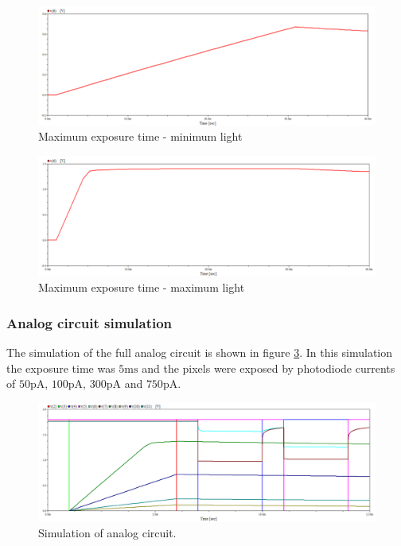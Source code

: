 \begin{figure}
    \centering
    \includegraphics[width=\textwidth]{graphs/maxExp_minLight.png}
    \caption{Maximum exposure time - minimum light}
    \label{fig:max-min}
\end{figure}

\begin{figure}
    \centering
    \includegraphics[width=\textwidth]{graphs/maxExp_maxLight.png}
    \caption{Maximum exposure time - maximum light}
    \label{fig:max-max}
\end{figure}

\subsubsection{Analog circuit simulation}

The simulation of the full analog circuit is shown in figure \ref{fig:analogWaveform}. In this simulation the exposure time was $5 \mathrm{ms}$ and the pixels were exposed by photodiode currents of $50 \mathrm{pA}$, $100 \mathrm{pA}$, $300 \mathrm{pA}$ and $750 \mathrm{pA}$.

\begin{figure}
    \centering
    \includegraphics[width=\textwidth]{graphs/analogWaveform.png}
    \caption{Simulation of analog circuit.}
    \label{fig:analogWaveform}
\end{figure}

